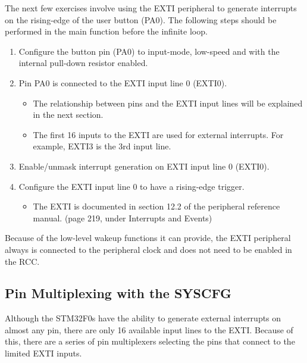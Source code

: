 \documentclass[11pt,fleqn]{book} %
\begin{document}
\begin{exercise}
    \label{ex2}
   The next few exercises involve using the EXTI peripheral to generate interrupts on the rising-edge of the user button (PA0). The following steps should be performed in the main function before the infinite loop. 
    \begin{enumerate}
        \item Configure the button pin (PA0) to input-mode, low-speed and with the internal pull-down resistor enabled. 
        \item Pin PA0 is connected to the EXTI input line 0 (EXTI0). 
        \begin{itemize}
            \item The relationship between pins and the EXTI input lines will be explained in the next section. 
            \item The first 16 inputs to the EXTI are used for external interrupts. For example, EXTI3 is the 3rd input line.
        \end{itemize}
        \item Enable/unmask interrupt generation on EXTI input line 0 (EXTI0).
        \item Configure the EXTI input line 0 to have a rising-edge trigger.
        \begin{itemize}
            \item The EXTI is documented in section 12.2 of the peripheral reference manual. (page 219, under Interrupts and Events)
        \end{itemize}
    \end{enumerate}

    \noindent Because of the low-level wakeup functions it can provide, the EXTI peripheral always is connected to the peripheral clock and does not need to be enabled in the RCC.   
\end{exercise}



\subsection{Pin Multiplexing with the SYSCFG} \label{syscfg}
Although the STM32F0s have the ability to generate external interrupts on almost any pin, there are only 16 available input lines to the EXTI. Because of this, there are a series of pin multiplexers selecting the pins that connect to the limited EXTI inputs.  
\end{document}
